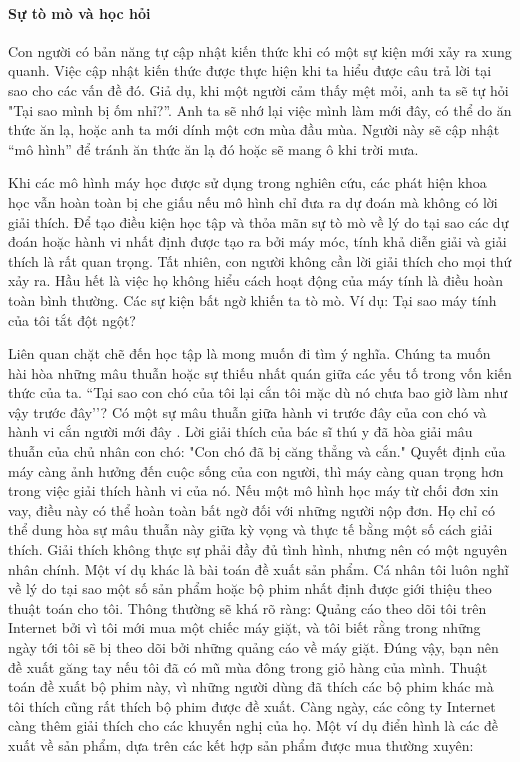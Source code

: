 \paragraph{Sự tò mò và học hỏi} Con người có bản năng tự cập nhật kiến thức khi có một sự kiện mới xảy ra xung quanh. Việc cập nhật kiến thức được thực hiện khi ta hiểu được câu trả lời tại sao cho các vấn đề đó. Giả dụ, khi một người cảm thấy mệt mỏi, anh ta sẽ tự hỏi "Tại sao mình bị ốm nhỉ?''. Anh ta sẽ nhớ lại việc mình làm mới đây, có thể do ăn thức ăn lạ, hoặc anh ta mới dính một cơn mùa đầu mùa. Người này sẽ cập nhật ``mô hình'' để tránh ăn thức ăn lạ đó hoặc sẽ mang ô khi trời mưa. 

Khi các mô hình máy học được sử dụng trong nghiên cứu, các phát hiện khoa học vẫn hoàn toàn bị che giấu nếu mô hình chỉ đưa ra dự đoán mà không có lời giải thích. Để tạo điều kiện học tập và thỏa mãn sự tò mò về lý do tại sao các dự đoán hoặc hành vi nhất định được tạo ra bởi máy móc, tính khả diễn giải và giải thích là rất quan trọng. Tất nhiên, con người không cần lời giải thích cho mọi thứ xảy ra. Hầu hết là việc họ không hiểu cách hoạt động của máy tính là điều hoàn toàn bình thường. Các sự kiện bất ngờ khiến ta tò mò. Ví dụ: Tại sao máy tính của tôi tắt đột ngột?

Liên quan chặt chẽ đến học tập là mong muốn đi tìm ý nghĩa. Chúng ta muốn hài hòa những mâu thuẫn hoặc sự thiếu nhất quán giữa các yếu tố trong vốn kiến thức của ta. ``Tại sao con chó của tôi lại cắn tôi mặc dù nó chưa bao giờ làm như vậy trước đây’’? Có một sự mâu thuẫn giữa hành vi trước đây của con chó và hành vi cắn người mới đây . Lời giải thích của bác sĩ thú y đã hòa giải mâu thuẫn của chủ nhân con chó: "Con chó đã bị căng thẳng và cắn." Quyết định của máy càng ảnh hưởng đến cuộc sống của con người, thì máy càng quan trọng hơn trong việc giải thích hành vi của nó. Nếu một mô hình học máy từ chối đơn xin vay, điều này có thể hoàn toàn bất ngờ đối với những người nộp đơn. Họ chỉ có thể dung hòa sự mâu thuẫn này giữa kỳ vọng và thực tế bằng một số cách giải thích. Giải thích không thực sự phải đầy đủ tình hình, nhưng nên có một nguyên nhân chính. Một ví dụ khác là bài toán đề xuất sản phẩm. Cá nhân tôi luôn nghĩ về lý do tại sao một số sản phẩm hoặc bộ phim nhất định được giới thiệu theo thuật toán cho tôi. Thông thường sẽ khá rõ ràng: Quảng cáo theo dõi tôi trên Internet bởi vì tôi mới mua một chiếc máy giặt, và tôi biết rằng trong những ngày tới tôi sẽ bị theo dõi bởi những quảng cáo về máy giặt. Đúng vậy, bạn nên đề xuất găng tay nếu tôi đã có mũ mùa đông trong giỏ hàng của mình. Thuật toán đề xuất bộ phim này, vì những người dùng đã thích các bộ phim khác mà tôi thích cũng rất thích bộ phim được đề xuất. Càng ngày, các công ty Internet càng thêm giải thích cho các khuyến nghị của họ. Một ví dụ điển hình là các đề xuất về sản phẩm, dựa trên các kết hợp sản phẩm được mua thường xuyên:

